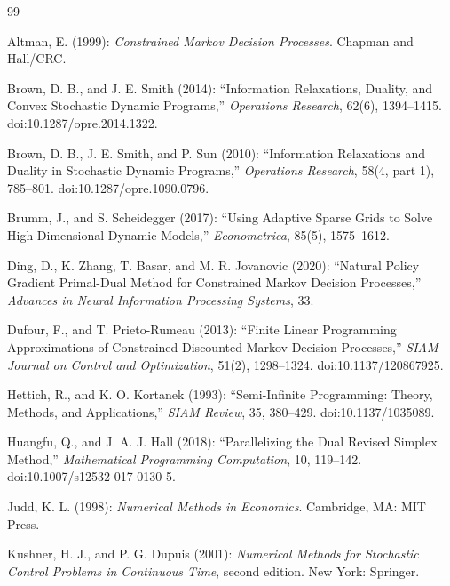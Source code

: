 \begin{thebibliography}{99}

Altman, E. (1999): \emph{Constrained Markov Decision Processes}. Chapman and Hall/CRC.

Brown, D. B., and J. E. Smith (2014): ``Information Relaxations, Duality, and Convex Stochastic Dynamic Programs,'' \emph{Operations Research}, 62(6), 1394--1415. doi:10.1287/opre.2014.1322.

Brown, D. B., J. E. Smith, and P. Sun (2010): ``Information Relaxations and Duality in Stochastic Dynamic Programs,'' \emph{Operations Research}, 58(4, part 1), 785--801. doi:10.1287/opre.1090.0796.

Brumm, J., and S. Scheidegger (2017): ``Using Adaptive Sparse Grids to Solve High-Dimensional Dynamic Models,'' \emph{Econometrica}, 85(5), 1575--1612.

Ding, D., K. Zhang, T. Basar, and M. R. Jovanovic (2020): ``Natural Policy Gradient Primal-Dual Method for Constrained Markov Decision Processes,'' \emph{Advances in Neural Information Processing Systems}, 33.

Dufour, F., and T. Prieto-Rumeau (2013): ``Finite Linear Programming Approximations of Constrained Discounted Markov Decision Processes,'' \emph{SIAM Journal on Control and Optimization}, 51(2), 1298--1324. doi:10.1137/120867925.

Hettich, R., and K. O. Kortanek (1993): ``Semi-Infinite Programming: Theory, Methods, and Applications,'' \emph{SIAM Review}, 35, 380--429. doi:10.1137/1035089.

Huangfu, Q., and J. A. J. Hall (2018): ``Parallelizing the Dual Revised Simplex Method,'' \emph{Mathematical Programming Computation}, 10, 119--142. doi:10.1007/s12532-017-0130-5.

Judd, K. L. (1998): \emph{Numerical Methods in Economics}. Cambridge, MA: MIT Press.

Kushner, H. J., and P. G. Dupuis (2001): \emph{Numerical Methods for Stochastic Control Problems in Continuous Time}, second edition. New York: Springer.


\end{thebibliography}
